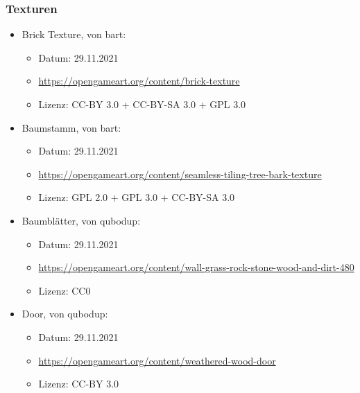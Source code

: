 \documentclass{article}
\begin{document}
\subsubsection*{Texturen}
\begin{itemize}
    \item Brick Texture, von bart:
        \begin{itemize}
            \item Datum: 29.11.2021
            \item \url{https://opengameart.org/content/brick-texture}
            \item Lizenz: CC-BY 3.0 + CC-BY-SA 3.0 + GPL 3.0
        \end{itemize}
    \item Baumstamm, von bart:
        \begin{itemize}
            \item Datum: 29.11.2021
            \item \url{https://opengameart.org/content/seamless-tiling-tree-bark-texture}
            \item Lizenz: GPL 2.0 + GPL 3.0 + CC-BY-SA 3.0
        \end{itemize}
    \item Baumblätter, von qubodup:
        \begin{itemize}
            \item Datum: 29.11.2021
            \item \url{https://opengameart.org/content/wall-grass-rock-stone-wood-and-dirt-480}
            \item Lizenz: CC0
        \end{itemize}
    \item Door, von qubodup:
        \begin{itemize}
            \item Datum: 29.11.2021
            \item \url{https://opengameart.org/content/weathered-wood-door}
            \item Lizenz: CC-BY 3.0
        \end{itemize}
\end{itemize}
\end{document}
